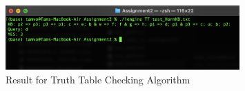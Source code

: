 \documentclass{assignment}
\begin{document}
                                                                                                                                                                                                                                                                                                                                                                                                                                                                                                                                                                                                                                                                                                                                                                                                                                                                                                                                                                                                                                                                                                                                                                                                                                                                                                                                                                                                                                                                                                                                                                                                                                                                                                                                                                                                                                                                                                                                                                                                                                                                                                                                                                                                                                                                                                                                                                                                                                                                                                                                                                 \begin{figure}[h]
    \centering
    \includegraphics[width=0.8\textwidth]{./assets/resultTT.png}
    \caption{Result for Truth Table Checking Algorithm}
    \label{fig:fig4}
\end{figure}
\end{document}

